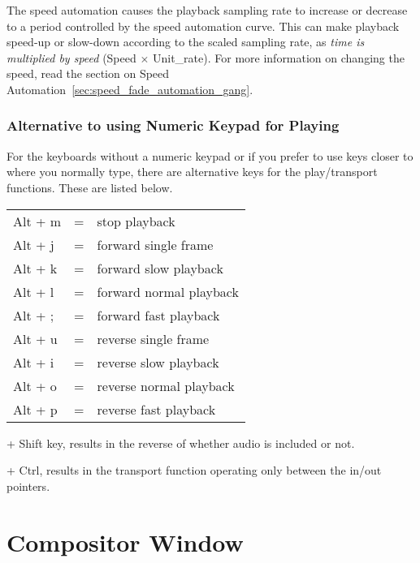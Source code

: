 The speed automation causes the playback sampling rate to increase or decrease to a period controlled by the speed automation curve.  
This can make playback speed-up or slow-down according to the scaled sampling rate, as \textit{time is multiplied by speed} (Speed $\times$ Unit\_rate). For more information on changing
the speed, read the section on Speed Automation~\ref{sec:speed_fade_automation_gang}.

\subsubsection*{Alternative to using Numeric Keypad for Playing}%
\label{ssub:alternative_to_using_numeric_keypad_for_playing}


For the keyboards without a numeric keypad or if you prefer to use keys closer to where you normally type, there are alternative keys for the play/transport functions.  These are listed below.

\begin{tabular}{lcl}
	Alt + m&=&stop playback\\

	Alt + j&=&forward single frame\\

	Alt + k&=&forward slow playback\\

	Alt + l&=&forward normal playback\\

	Alt + ;&=&forward fast playback\\

	Alt + u&=&reverse single frame\\

	Alt + i&=&reverse slow playback\\

	Alt + o&=&reverse normal playback\\

	Alt + p&=&reverse fast playback\\
\end{tabular}
\begin{minipage}{.45\linewidth}
+ Shift key, results in the reverse of whether audio is included or not.
\vspace{1ex}

+ Ctrl, results in the transport function operating only between the in/out pointers.
\end{minipage}

\section{Compositor Window}%
\label{sec:compositor_window}

